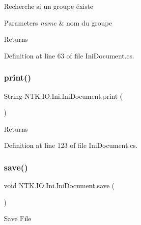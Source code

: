 Recherche si un groupe éxiste 


\begin{DoxyParams}{Parameters}
{\em name} & nom du groupe\\
\hline
\end{DoxyParams}
\begin{DoxyReturn}{Returns}

\end{DoxyReturn}


Definition at line 63 of file Ini\+Document.\+cs.

\mbox{\label{class_n_t_k_1_1_i_o_1_1_ini_1_1_ini_document_a3b1fb327dd3c8c171e2062d719b250bd}} 
\subsubsection{\texorpdfstring{print()}{print()}}
{\footnotesize\ttfamily String N\+T\+K.\+I\+O.\+Ini.\+Ini\+Document.\+print (\begin{DoxyParamCaption}{ }\end{DoxyParamCaption})}





\begin{DoxyReturn}{Returns}

\end{DoxyReturn}


Definition at line 123 of file Ini\+Document.\+cs.

\mbox{\label{class_n_t_k_1_1_i_o_1_1_ini_1_1_ini_document_a95d7360a38aa60e7814b1ab578d84486}} 
\subsubsection{\texorpdfstring{save()}{save()}}
{\footnotesize\ttfamily void N\+T\+K.\+I\+O.\+Ini.\+Ini\+Document.\+save (\begin{DoxyParamCaption}{ }\end{DoxyParamCaption})}



Save File 



